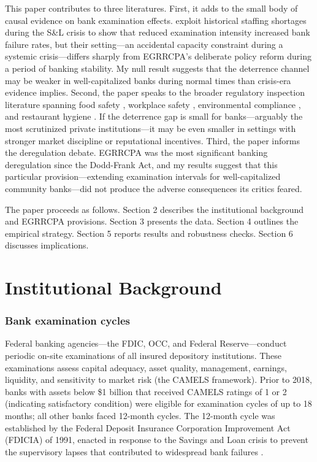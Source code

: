 \documentclass[12pt]{article}
\begin{document}
This paper contributes to three literatures. First, it adds to the small body of causal evidence on bank examination effects. \citet{kandrac2021} exploit historical staffing shortages during the S\&L crisis to show that reduced examination intensity increased bank failure rates, but their setting---an accidental capacity constraint during a systemic crisis---differs sharply from EGRRCPA's deliberate policy reform during a period of banking stability. My null result suggests that the deterrence channel may be weaker in well-capitalized banks during normal times than crisis-era evidence implies. Second, the paper speaks to the broader regulatory inspection literature spanning food safety \citep{jin2005}, workplace safety \citep{levine2012}, environmental compliance \citep{duflo2013}, and restaurant hygiene \citep{ho2012}. If the deterrence gap is small for banks---arguably the most scrutinized private institutions---it may be even smaller in settings with stronger market discipline or reputational incentives. Third, the paper informs the deregulation debate. EGRRCPA was the most significant banking deregulation since the Dodd-Frank Act, and my results suggest that this particular provision---extending examination intervals for well-capitalized community banks---did not produce the adverse consequences its critics feared.

The paper proceeds as follows. Section 2 describes the institutional background and EGRRCPA provisions. Section 3 presents the data. Section 4 outlines the empirical strategy. Section 5 reports results and robustness checks. Section 6 discusses implications.


\section{Institutional Background}

\subsubsection*{Bank examination cycles} Federal banking agencies---the FDIC, OCC, and Federal Reserve---conduct periodic on-site examinations of all insured depository institutions. These examinations assess capital adequacy, asset quality, management, earnings, liquidity, and sensitivity to market risk (the CAMELS framework). Prior to 2018, banks with assets below \$1 billion that received CAMELS ratings of 1 or 2 (indicating satisfactory condition) were eligible for examination cycles of up to 18 months; all other banks faced 12-month cycles. The 12-month cycle was established by the Federal Deposit Insurance Corporation Improvement Act (FDICIA) of 1991, enacted in response to the Savings and Loan crisis to prevent the supervisory lapses that contributed to widespread bank failures \citep{fdicia1991}.
\end{document}
